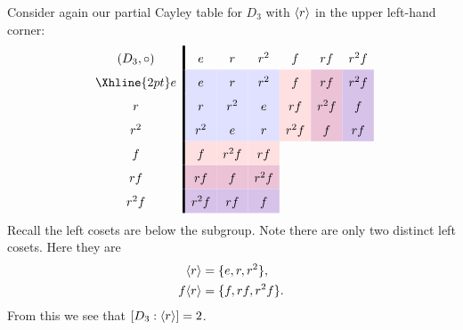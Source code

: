 \documentclass{ximera}
\begin{document}
\begin{example}
  Consider again our partial Cayley table for $D_3$ with $\langle r\rangle$ in
  the upper left-hand corner:
  \[
    \renewcommand{\arraystretch}{1.6}
    \begin{array}{c!{\vline width 2pt}cccccc}
      (D_3,\circ)& e                              & r                              & r^2                            & f                             & r f                                   & r^2 f  \\  \Xhline{2pt}
      e          & e\cellcolor{blue!12!white}     & r\cellcolor{blue!12!white}    & r^2\cellcolor{blue!12!white}   & f \cellcolor{red!12!white}    & r f \cellcolor{blue!33!red!24!white}   & r^2f \cellcolor{blue!66!red!24!white} \\  
      r                                  & r\cellcolor{blue!12!white}    & r^2\cellcolor{blue!12!white}   & e \cellcolor{blue!12!white}    & rf\cellcolor{red!12!white} & r^2f \cellcolor{blue!33!red!24!white}    & f \cellcolor{blue!66!red!24!white}   \\  
      r^2                                 & r^2\cellcolor{blue!12!white}   & e\cellcolor{blue!12!white}     & r\cellcolor{blue!12!white}    & r^2 f \cellcolor{red!12!white}   & f \cellcolor{blue!33!red!24!white} & rf \cellcolor{blue!66!red!24!white}   \\  
      f        & f \cellcolor{red!12!white}    & r^2f \cellcolor{red!12!white}   & r f \cellcolor{red!12!white} &     &   &   \\  
      r f       & rf \cellcolor{blue!33!red!24!white}   & f \cellcolor{blue!33!red!24!white} & r^2f \cellcolor{blue!33!red!24!white}   &    &      &     \\  
      r^2 f       & r^2 f\cellcolor{blue!66!red!24!white} & rf \cellcolor{blue!66!red!24!white}    & f \cellcolor{blue!66!red!24!white}  &     &     &      \\  
    \end{array}
    \]
    Recall the left cosets are below the subgroup. Note there are only
    two distinct left cosets. Here they are
    \begin{align*}
      \langle r\rangle &= \{e, r, r^2\},\\
      f\langle r\rangle &= \{f, rf, r^2f\}.
    \end{align*}
    From this we see that $[D_3: \langle r\rangle] = 2$.
\end{example}
\end{document}
